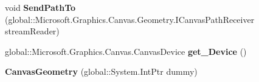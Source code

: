 \begin{DoxyCompactItemize}
void {\bfseries Send\+Path\+To} (global\+::\+Microsoft.\+Graphics.\+Canvas.\+Geometry.\+I\+Canvas\+Path\+Receiver stream\+Reader)
\item 
\mbox{\label{class_microsoft_1_1_graphics_1_1_canvas_1_1_geometry_1_1_canvas_geometry_a5c318bc4d58999fcf66c9bafd45ffe8b}} 
global\+::\+Microsoft.\+Graphics.\+Canvas.\+Canvas\+Device {\bfseries get\+\_\+\+Device} ()
\item 
\mbox{\label{class_microsoft_1_1_graphics_1_1_canvas_1_1_geometry_1_1_canvas_geometry_aa2808482bc01ed6dfc625b6e9d3ef3ca}} 
{\bfseries Canvas\+Geometry} (global\+::\+System.\+Int\+Ptr dummy)
\end{DoxyCompactItemize}
